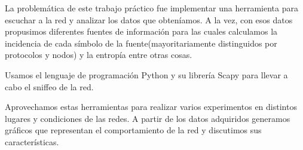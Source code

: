 La problemática de este trabajo práctico fue implementar una herramienta para escuchar a la red y analizar los datos que obteníamos. A la vez, con esos datos propusimos diferentes
fuentes de información para las cuales calculamos la incidencia de cada símbolo de la fuente(mayoritariamente distinguidos por protocolos y nodos) y la entropía entre otras 
cosas. 

Usamos el lenguaje de programación Python y su librería Scapy para llevar a cabo el sniffeo de la red. 

Aprovechamos estas herramientas para realizar varios experimentos en distintos lugares y condiciones de las redes. A partir de los datos adquiridos generamos gráficos que representan
el comportamiento de la red y discutimos sus características.